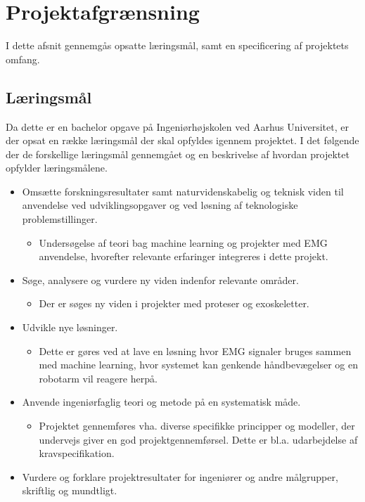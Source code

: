 \thispagestyle{fancy}
\chapter{Projektafgrænsning}
\label{chp:projektafgraensning}
I dette afsnit gennemgås opsatte læringsmål, samt en specificering af projektets omfang. 
\section{Læringsmål}
Da dette er en bachelor opgave på Ingeniørhøjskolen ved Aarhus Universitet, er der opsat en række læringsmål der skal opfyldes igennem projektet. I det følgende der de forskellige læringsmål gennemgået og en beskrivelse af hvordan projektet opfylder læringsmålene.
\begin{itemize}
	\item Omsætte forskningsresultater samt naturvidenskabelig og teknisk viden til anvendelse ved udviklingsopgaver og ved løsning af teknologiske problemstillinger.
	\begin{itemize}
		\item Undersøgelse af teori bag machine learning og projekter med EMG anvendelse, hvorefter relevante erfaringer integreres i dette projekt. 
	\end{itemize}
	\item Søge, analysere og vurdere ny viden indenfor relevante områder.
	\begin{itemize}
		\item Der er søges ny viden i projekter med proteser og exoskeletter. 
	\end{itemize}
	\item Udvikle nye løsninger.
	\begin{itemize}
		\item Dette er gøres ved at lave en løsning hvor EMG signaler bruges sammen med machine learning, hvor systemet kan genkende håndbevægelser og en robotarm vil reagere herpå.
	\end{itemize}
	\item Anvende ingeniørfaglig teori og metode på en systematisk måde.
	\begin{itemize}
		\item Projektet gennemføres vha. diverse specifikke principper og modeller, der undervejs giver en god projektgennemførsel. Dette er bl.a. udarbejdelse af kravspecifikation.
	\end{itemize}
	\item Vurdere og forklare projektresultater for ingeniører og andre målgrupper, skriftlig og mundtligt.

\end{itemize}

